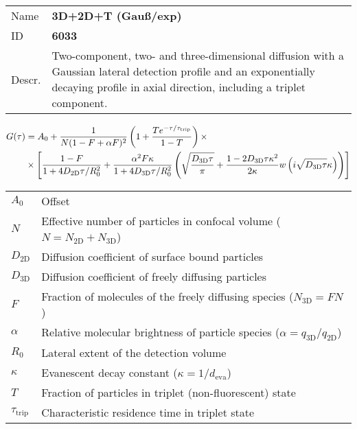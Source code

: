 \noindent \begin{tabular}{lp{}}
Name & \textbf{3D+2D+T (Gauß/exp)} \\ 
ID & \textbf{6033} \\ 
Descr. &  Two-component, two- and three-dimensional diffusion with a Gaussian lateral detection profile and an exponentially decaying profile in axial direction, including a triplet component. \\ 
\end{tabular}
\begin{align}
G(\tau) &= A_0 + \frac{1}{N (1-F + \alpha F)^2} \left(1 + \frac{T e^{-\tau/\tau_\mathrm{trip}}}{1-T}  \right)  \times \\
& \notag \times  \left[
\frac{1-F}{1+ 4 D_\mathrm{2D} \tau/R_0^2} + 
\frac{\alpha^2 F \kappa}{1+ 4 D_\mathrm{3D} \tau/R_0^2} 
\left( \sqrt{\frac{D_\mathrm{3D} \tau}{\pi}} + \frac{1 - 2 D_\mathrm{3D} \tau \kappa^2}{2 \kappa}  w\left(i \sqrt{D_\mathrm{3D} \tau} \kappa\right) \right) \right]
\end{align} 
\begin{center}
\begin{tabular}{ll}
$A_0$ & Offset \\ 
$N$ & Effective number of particles in confocal volume ($N = N_\mathrm{2D}+N_\mathrm{3D}$) \\ 
$D_\mathrm{2D}$ &  Diffusion coefficient of surface bound particles \\ 
$D_\mathrm{3D}$ &  Diffusion coefficient of freely diffusing particles \\ 
$F$ & Fraction of molecules of the freely diffusing species ($N_\mathrm{3D} = F N$) \\
$\alpha$ & Relative molecular brightness of particle species ($ \alpha = q_\mathrm{3D}/q_\mathrm{2D}$) \\
$R_0$ & Lateral extent of the detection volume \\
$\kappa$ &  Evanescent decay constant ($\kappa = 1/d_\mathrm{eva}$)\\ 
$T$ &  Fraction of particles in triplet (non-fluorescent) state\\ 
$\tau_\mathrm{trip}$ &  Characteristic residence time in triplet state \\ 
\end{tabular}
\end{center}
\vspace{2em}


